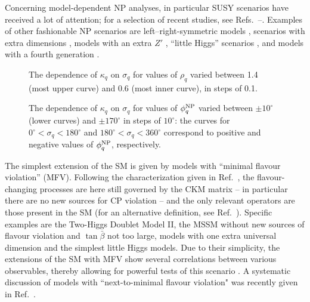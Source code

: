 \documentclass[11pt]{cernrep}
\begin{document}
Concerning model-dependent NP analyses, in particular SUSY
scenarios have received a lot of attention; for a selection of recent studies, see
Refs.~\cite{GOSST}--\cite{GHK}. Examples of other fashionable NP scenarios 
are left--right-symmetric models \cite{LR-sym}, scenarios with extra dimensions
\cite{extra-dim}, models with an extra $Z'$ \cite{Z-prime}, ``little Higgs'' 
scenarios \cite{little-higgs}, and models with a fourth generation \cite{hou-4}.


\begin{figure}
\centerline{
\textwidth{}
 }
 \vspace*{-0.3truecm}
\caption[]{The dependence of $\kappa_q$ on $\sigma_q$ for values of 
$\rho_q$ varied between 1.4 (most upper curve) and 0.6 (most inner curve),
in steps of 0.1.}\label{fig:kappa-rho}
\end{figure}


\begin{figure}
\centerline{
\textwidth{}
 }
 \vspace*{-0.3truecm}
\caption[]{The dependence of $\kappa_q$ on $\sigma_q$ for values of 
$\phi_q^{\rm NP}$ varied between $\pm10^\circ$ (lower curves) and 
$\pm170^\circ$ in steps of $10^\circ$: the curves for $0^\circ<\sigma_q<180^\circ$
and $180^\circ<\sigma_q<360^\circ$ correspond to positive and negative values
of $\phi_q^{\rm NP}$, respectively.}\label{fig:kappa-phi}
\end{figure}


The simplest extension of the SM is given by models with ``minimal flavour violation'' (MFV). Following the characterization given in Ref.~\cite{MFV-1}, 
the flavour-changing processes are here still governed by the CKM matrix -- in 
particular there are no new sources for CP violation --  and the only relevant 
operators are those present in the SM (for an alternative definition, see 
Ref.~\cite{MFV-2}). Specific examples are the Two-Higgs Doublet Model II,
the MSSM without new sources of flavour violation and $\tan\bar\beta$ not
too large, models with one extra universal dimension and the simplest
little Higgs models. Due to their simplicity, the extensions of the SM with
MFV show several correlations between various observables, 
thereby allowing for powerful tests of this scenario \cite{buras-MFV}. A 
systematic discussion of  models with ``next-to-minimal flavour violation" was 
recently given in Ref.~\cite{NMFV}.
\end{document}
